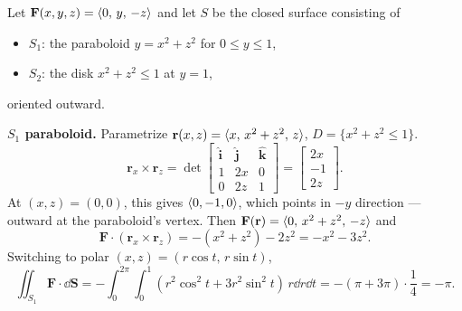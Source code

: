 \begin{example}
  Let $\mathbf{F}(x,y,z) = \langle 0,\,y,\,-z \rangle$ and let $S$ be the closed surface consisting of
  \begin{itemize}
    \item $S_1$: the paraboloid $y = x^2 + z^2$ for $0\leq y\leq 1$,
    \item $S_2$: the disk $x^2 + z^2 \leq 1$ at $y = 1$,
  \end{itemize}
  oriented outward.

  \begin{center}
  \end{center}

  \textbf{$S_1$ paraboloid.} Parametrize $\mathbf{r}(x,z) = \langle x,\,x^2+z^2,\,z \rangle$, $D = \{x^2+z^2\leq 1\}$.
  \[
    \mathbf{r}_x\times\mathbf{r}_z
    = \det
    \begin{bmatrix}
      \hat{\mathbf{i}} & \hat{\mathbf{j}} & \hat{\mathbf{k}} \\
      1                & 2x               & 0                \\
      0                & 2z               & 1
    \end{bmatrix}
    =
    \begin{bmatrix}
      2x \\ -1 \\ 2z
    \end{bmatrix}
    .
  \]
  At $(x,z) = (0,0)$, this gives $\langle 0,-1,0 \rangle$, which points in $-y$ direction --- outward at the
  paraboloid's vertex. Then $\mathbf{F}(\mathbf{r}) = \langle 0,\,x^2+z^2,\,-z \rangle$ and
  \[
    \mathbf{F}\cdot(\mathbf{r}_x\times\mathbf{r}_z) = -(x^2+z^2) - 2z^2 = -x^2 - 3z^2.
  \]
  Switching to polar $(x,z) = (r\cos t,\,r\sin t)$,
  \[
    \iint_{S_1}\mathbf{F}\cdot\dd{\mathbf{S}}
    = -\int_0^{2\pi}\!\int_0^1 (r^2\cos^2 t + 3r^2\sin^2 t)\,r\dd{r}\dd{t}
    = -(\pi + 3\pi)\cdot\frac{1}{4}
    = -\pi.
  \]


\end{example}
